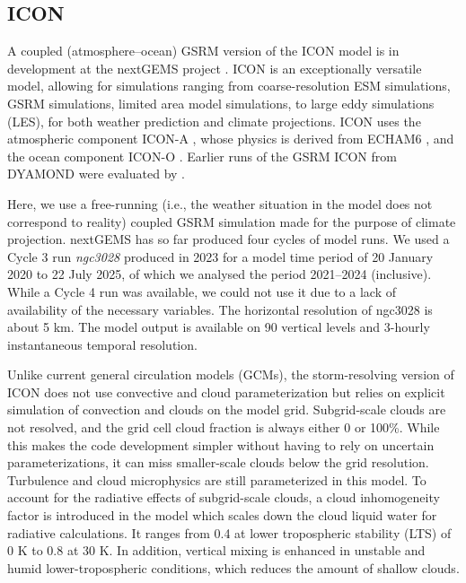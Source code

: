 \documentclass[draft]{agujournal2019}
\begin{document}
\subsection{ICON}
\label{sec:icon}

A coupled (atmosphere--ocean) GSRM version of the ICON model is in development
at the nextGEMS project . ICON is an exceptionally
versatile model, allowing for simulations ranging from coarse-resolution ESM
simulations, GSRM simulations, limited area model simulations, to large eddy
simulations (LES), for both weather prediction and climate projections. ICON
uses the atmospheric component ICON-A , whose physics is
derived from ECHAM6 , and the ocean component ICON-O
. Earlier runs of the GSRM ICON from DYAMOND were evaluated by
.

Here, we use a free-running (i.e., the weather situation in the model does not
correspond to reality) coupled GSRM simulation made for the purpose of climate
projection.  nextGEMS has so far produced four cycles of model runs. We used a
Cycle 3 run \emph{ngc3028} produced in 2023 
for a model time period of 20 January 2020 to 22 July 2025, of which we
analysed the period 2021--2024 (inclusive). While a Cycle 4 run was available,
we could not use it due to a lack of availability of the necessary variables.
The horizontal resolution of ngc3028 is about 5 km.  The model output is
available on 90 vertical levels and 3-hourly instantaneous temporal resolution.

Unlike current general circulation models (GCMs), the storm-resolving version
of ICON does not use convective and cloud parameterization but relies on
explicit simulation of convection and clouds on the model grid. Subgrid-scale
clouds are not resolved, and the grid cell cloud fraction is always either 0 or
100\%. While this makes the code development simpler without having to rely on
uncertain parameterizations, it can miss smaller-scale clouds below the grid
resolution.  Turbulence and cloud microphysics are still parameterized in this
model. To account for the radiative effects of subgrid-scale clouds, a cloud
inhomogeneity factor is introduced in the model which scales down the cloud
liquid water for radiative calculations. It ranges from 0.4 at lower
tropospheric stability (LTS) of 0 K to 0.8 at 30 K. In addition, vertical
mixing is enhanced in unstable and humid lower-tropospheric conditions, which
reduces the amount of shallow clouds.
\end{document}
